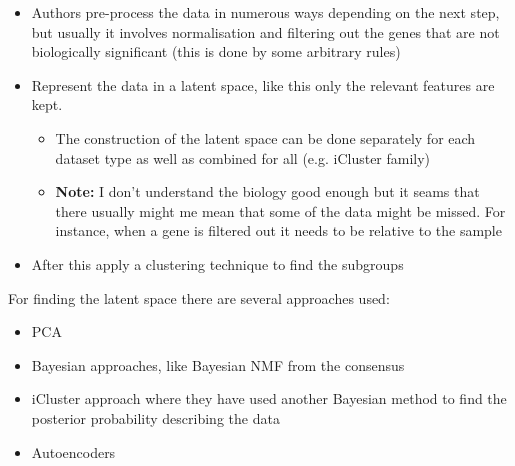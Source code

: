 \begin{itemize}
    \item Authors pre-process the data in numerous ways depending on the next step, but usually it involves normalisation and filtering out the genes that are not biologically significant (this is done by some arbitrary rules)
    
    \item Represent the data in a latent space, like this only the relevant features are kept. 
    \begin{itemize}
        \item The construction of the latent space can be done separately for each dataset type as well as combined for all (e.g. iCluster family)
        \item \textbf{Note:} I don't understand the biology good enough but it seams that there usually might me mean that some of the data might be missed. For instance, when a gene is filtered out it needs to be relative to the sample
    \end{itemize}
    
    \item After this apply a clustering technique to find the subgroups
\end{itemize}

For finding the latent space there are several approaches used:

\begin{itemize}
    \item PCA
    \item Bayesian approaches, like Bayesian NMF from the consensus 
    \item iCluster approach where they have used another Bayesian method to find the posterior probability describing the data
    \item Autoencoders
    
\end{itemize}


\newpage

